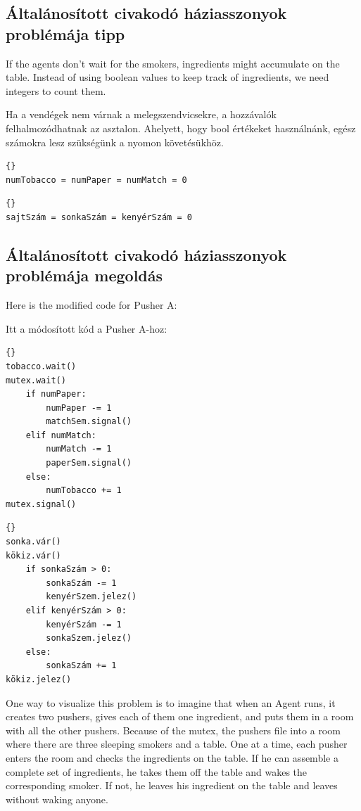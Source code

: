 \documentclass{book}
\newcommand{\clearemptydoublepage}{\newpage\cleardoublepage}
\begin{document}
\clearemptydoublepage
\subsection{Általánosított civakodó háziasszonyok problémája tipp}

If the agents don't wait for the smokers, ingredients might
accumulate on the table.  Instead of using boolean values to
keep track of ingredients, we need integers to count them.

Ha a vendégek nem várnak a melegszendvicsekre, a hozzávalók felhalmozódhatnak
az asztalon. Ahelyett, hogy bool értékeket használnánk, egész
számokra lesz szükségünk a nyomon követésükhöz.

\begin{lstlisting}[title={Generalized Smokers problem hint}]{}
numTobacco = numPaper = numMatch = 0
\end{lstlisting}

\begin{lstlisting}[title={Általánosított civakodó háziasszonyok problémája tipp}]{}
sajtSzám = sonkaSzám = kenyérSzám = 0
\end{lstlisting}

\clearemptydoublepage
\subsection{Általánosított civakodó háziasszonyok problémája megoldás}
\label{smoker}

Here is the modified code for Pusher A:

Itt a módosított kód a Pusher A-hoz:

\begin{lstlisting}[title={Pusher A}]{}
tobacco.wait()
mutex.wait()
    if numPaper:
        numPaper -= 1
        matchSem.signal()
    elif numMatch:
        numMatch -= 1
        paperSem.signal()
    else: 
        numTobacco += 1
mutex.signal()
\end{lstlisting}

\begin{lstlisting}[title={Pusher A}]{}
sonka.vár()
kökiz.vár()
    if sonkaSzám > 0:
        sonkaSzám -= 1
        kenyérSzem.jelez()
    elif kenyérSzám > 0:
        kenyérSzám -= 1
        sonkaSzem.jelez()
    else: 
        sonkaSzám += 1
kökiz.jelez()
\end{lstlisting}

One way to visualize this problem is to imagine that when an
Agent runs, it creates two pushers, gives each of them one ingredient,
and puts them in a room with all the other pushers.  Because of the
mutex, the pushers file into a room where there are
three sleeping smokers and a table.  One at a time, each pusher enters
the room and checks the ingredients on the table.  If he can
assemble a complete set of ingredients, he takes them off the table
and wakes the corresponding smoker.  If not, he leaves his ingredient
on the table and leaves without waking anyone.
\end{document}
